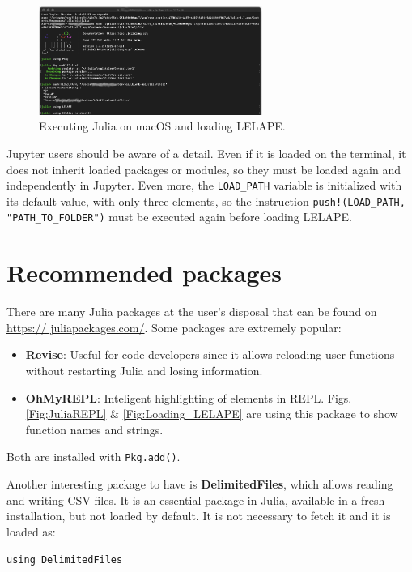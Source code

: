 \begin{figure}
	\centering
	\includegraphics[width=0.65\textwidth]{fig/Julia_in_macOS_anonymous}
	\caption{Executing Julia on macOS and loading LELAPE.}
	\label{Fig:Julia_in_macoc}
\end{figure}

Jupyter users should be aware of a detail. Even if it is loaded on the terminal, it does not inherit loaded packages or modules, so they must be loaded again and independently in Jupyter. Even more, the \texttt{LOAD\_PATH} variable is initialized with its default value, with only three elements, so the instruction \texttt{push!(LOAD\_PATH, "PATH\_TO\_FOLDER")} must be executed again before loading LELAPE.

\section{Recommended packages}
%
There are many Julia packages at the user's disposal that can be found on \href{https://juliapackages.com/}{https:// juliapackages.com/}. Some packages are extremely popular:
\begin{itemize}
	\item \textbf{Revise}: Useful for code developers since it allows reloading user functions without restarting Julia and losing information.
	\item \textbf{OhMyREPL}: Inteligent highlighting of elements in REPL. Figs. \ref{Fig;JuliaREPL} \& \ref{Fig:Loading_LELAPE} are using this package to show function names and strings.
\end{itemize}

Both are installed with \texttt{Pkg.add()}. 

Another interesting package to have is \textbf{DelimitedFiles}, which allows reading and writing CSV files. It is an essential package in Julia, available in a fresh installation, but not loaded by default. It is not necessary to fetch it and it is loaded as:
	
\vspace{1mm}
\begin{center}
	\texttt{using DelimitedFiles}
\end{center}
\vspace{1mm}	

